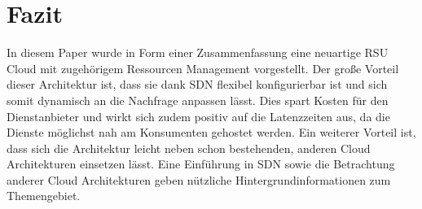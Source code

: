 \documentclass[conference]{IEEEtran}
\begin{document}
\section{Fazit}

In diesem Paper wurde in Form einer Zusammenfassung eine neuartige RSU Cloud mit zugehörigem Ressourcen Management vorgestellt. Der große Vorteil dieser Architektur ist, dass sie dank SDN flexibel konfigurierbar ist und sich somit dynamisch an die Nachfrage anpassen lässt. Dies spart Kosten für den Dienstanbieter und wirkt sich zudem positiv auf die Latenzzeiten aus, da die Dienste möglichst nah am Konsumenten gehostet werden. Ein weiterer Vorteil ist, dass sich die Architektur leicht neben schon bestehenden, anderen Cloud Architekturen einsetzen lässt.
Eine Einführung in SDN sowie die Betrachtung anderer Cloud Architekturen geben nützliche Hintergrundinformationen zum Themengebiet.




%
%
%

\newpage
\end{document}
